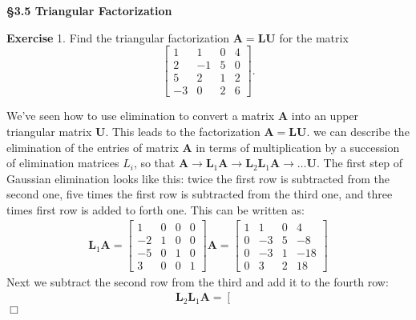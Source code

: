 \documentclass[UTF8,12pt,hyperref]{ctexart}
\makeatletter
\newenvironment{exercise}[1][{\color{blue}\bf Exercise}]%
{%
 \begin{center}   \begin{lrbox}{\@tempboxa}%
    \begin{minipage}{\textwidth}%
  {\color{blue}\bfseries
#1}   }{%
    \end{minipage}%
    \end{lrbox}
    \colorbox{green}{\noindent\usebox{\@tempboxa}} \end{center}  
}
\newenvironment{solve}[1][\color{blue}\bf Solve]{\begin{trivlist}
\item[\hskip \labelsep {\color{blue}\bfseries
#1}]}{\hfill$\Box$\end{trivlist}}
\makeatother
\begin{document}
 
\begin{center}  \bf \Large
{\S 3.5 Triangular Factorization }
\end{center} 
\begin{exercise}1. \quad
\quad Find the triangular factorization $\boldsymbol{A}=\boldsymbol{LU}$ for the matrix
$$
\left[\begin{array}{rrrr}
1 & 1 & 0 & 4  \\
2 & -1 & 5 & 0 \\
5 & 2 & 1 & 2  \\
-3 & 0 & 2 & 6
\end{array}\right]. 
$$
\end{exercise}
\begin{solve}
  We've seen how to use elimination to convert a matrix $\boldsymbol{A}$ into an upper
triangular matrix $\boldsymbol{U}$. This leads to the factorization $\boldsymbol{A} = \boldsymbol{LU}$.
we can describe the elimination of the entries of matrix $\boldsymbol{A}$ in terms of multiplication by a succession of
elimination matrices $L_{i}$, so that $\boldsymbol{A}\longrightarrow \boldsymbol{L}_1\boldsymbol{A}\longrightarrow \boldsymbol{L}_2\boldsymbol{L}_{1}\boldsymbol{A}\longrightarrow \dots \boldsymbol{U}$.
The first step of Gaussian elimination looks like this: twice the first row is subtracted from
the second one,  five times the first row is subtracted from the third one, and three times 
first row is added to forth one. This can be written as:
\begin{align*}
  \boldsymbol{L}_1\boldsymbol{A} = \left[\begin{array}{rrrr}
    1 & 0 & 0 & 0  \\
    -2 & 1 & 0 & 0 \\
    -5 &0 & 1 & 0  \\
    3 & 0 & 0 & 1
    \end{array}\right]\boldsymbol{A}=\left[\begin{array}{rrrr}
      1 & 1 & 0 & 4  \\
      0 & -3 & 5 & -8 \\
      0 & -3 & 1 & -18  \\
      0 & 3 & 2 & 18
      \end{array}\right]
\end{align*}
Next we subtract the second row from the third and add it to the fourth row:
\begin{align*}
  \boldsymbol{L}_2\boldsymbol{L}_1\boldsymbol{A} =
  \left[\begin{array}{rrrr}

\end{array}
\end{align*}
\end{solve}
\end{document}
